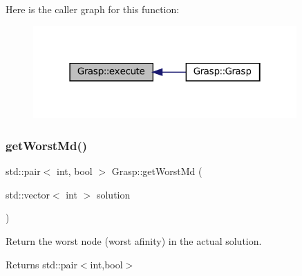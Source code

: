 Here is the caller graph for this function\+:
\nopagebreak
\begin{figure}[H]
\begin{center}
\leavevmode
\includegraphics[width=286pt]{classGrasp_a335b063bccd26b434dda3a3a69d6d711_icgraph}
\end{center}
\end{figure}
\mbox{\label{classGrasp_a858a5aee4066bf5ef7946e8ea3e10bcf}} 
\subsubsection{\texorpdfstring{get\+Worst\+Md()}{getWorstMd()}}
{\footnotesize\ttfamily std\+::pair$<$ int, bool $>$ Grasp\+::get\+Worst\+Md (\begin{DoxyParamCaption}\item[{std\+::vector$<$ int $>$}]{solution }\end{DoxyParamCaption})}



Return the worst node (worst afinity) in the actual solution. 

\begin{DoxyReturn}{Returns}
std\+::pair$<$int,bool$>$ 
\end{DoxyReturn}

